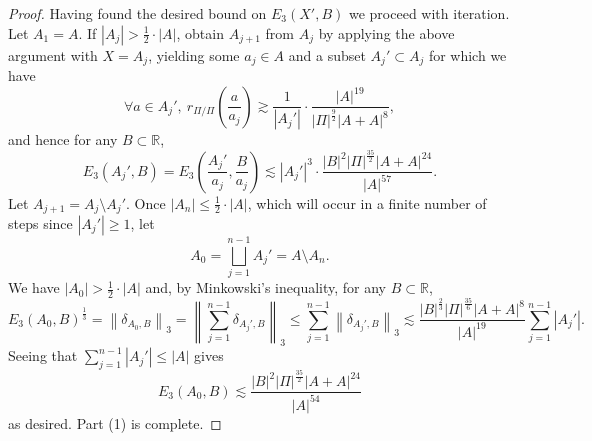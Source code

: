 \documentclass[10pt,a4paper]{amsart}
\begin{document}
\begin{proof}
Having found the desired bound on \(E_3(X',B)\) we proceed with iteration.
Let \(A_1 = A\). 
If \(\left\lvert A_{j} \right\rvert  > \frac{1}{2} \cdot \left\lvert A \right\rvert  \), obtain \(A_{j+1} \) from \(A_{j} \) by applying the above argument
with \(X = A_{j} \), yielding some \(a_{j}  \in A\) and a subset \(A_{j} ' \subset A_{j} \) for which we have
\[
    \forall a \in A_{j} ' ,~ r_{ \Pi / \Pi } \left( \frac{a}{a_{j} }   \right)  \gtrsim \frac{1}{\left\lvert A_{j} ' \right\rvert } \cdot \frac{\left\lvert A \right\rvert ^{19}}{\left\lvert \Pi \right\rvert ^{\frac{9}{2} } \left\lvert A + A \right\rvert ^{8}} 
,\]
and hence for any \(B \subset \mathbb{R} \),
\[
    E_3(A_{j} ',B) = E_3 \left( \frac{A_{j} '}{a_{j} } , \frac{B}{a_{j} }    \right) \lesssim \left\lvert A_{j} ' \right\rvert ^{3} \cdot \frac{\left\lvert B \right\rvert ^{2} \left\lvert \Pi \right\rvert ^{\frac{35}{2} }\left\lvert A+A \right\rvert ^{24}}{\left\lvert A \right\rvert ^{57}} 
.\]
Let \(A_{j+1} = A_{j} \setminus A_{j} ' \). Once \(\left\lvert A_{n}  \right\rvert \leq \frac{1}{2} \cdot \left\lvert A \right\rvert     \), which will occur in a finite number of steps since \(\left\lvert A_{j} '  \right\rvert \geq 1\),
let
\[
    A_0 = \bigsqcup  _{j=1} ^{n-1}A_{j} ' = A \setminus A_{n} 
.\]
We have \(\left\lvert A_0 \right\rvert > \frac{1}{2} \cdot \left\lvert A \right\rvert \) and, by Minkowski's inequality, for any \(B \subset \mathbb{R} \),
\[
    E_3(A_0,B)^{\frac{1}{3} } = \left\lVert \delta_{A_0,B}  \right\rVert _{3} = \left\lVert \sum _{j =1} ^{n-1} \delta_{A_{j}' ,B}  \right\rVert _{3} \leq \sum _{j=1} ^{n-1} \left\lVert \delta_{A_{j}' ,B}  \right\rVert _{3} \lesssim \frac{\left\lvert B \right\rvert ^{\frac{2}{3} } \left\lvert \Pi \right\rvert ^{\frac{35}{6}  } \left\lvert A+ A \right\rvert ^{8}}{\left\lvert A \right\rvert ^{19}} \sum _{j=1} ^{n-1} \left\lvert A_{j} ' \right\rvert 
.\]
Seeing that \( \sum _{j=1} ^{n-1}\left\lvert A_{j} ' \right\rvert \leq \left\lvert A \right\rvert   \) gives
\[
    E_3(A_0,B)\lesssim \frac{\left\lvert B \right\rvert^{2}  \left\lvert \Pi \right\rvert ^{\frac{35}{2} } \left\lvert A+A \right\rvert ^{24}}{\left\lvert A \right\rvert ^{54}} 
\]
as desired. Part (1) is complete.


\end{proof}
\end{document}

